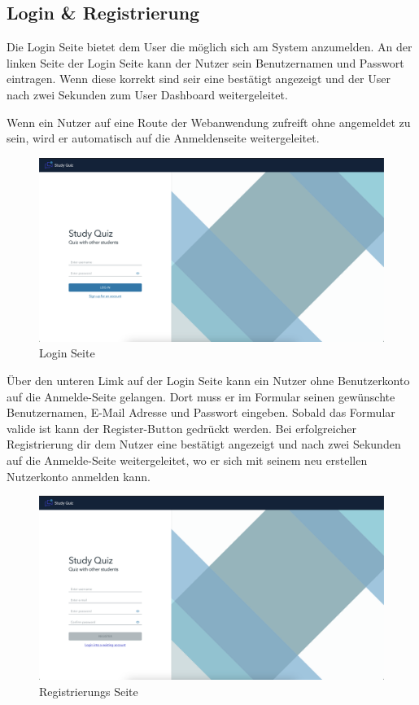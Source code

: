\subsection*{Login \& Registrierung}

Die Login Seite bietet dem User die möglich sich am System anzumelden. 
An der linken Seite der Login Seite kann der Nutzer sein Benutzernamen
und Passwort eintragen. Wenn diese korrekt sind seir eine bestätigt angezeigt
und der User nach zwei Sekunden zum User Dashboard weitergeleitet. \newline

\noindent Wenn ein Nutzer auf eine Route der Webanwendung zufreift ohne angemeldet
zu sein, wird er automatisch auf die Anmeldenseite weitergeleitet.

\begin{figure}[H]
  \includegraphics[width=\linewidth]{img/login.png}
  \caption{Login Seite}
  \label{fig:login}
\end{figure}

Über den unteren Limk auf der Login Seite kann ein Nutzer ohne Benutzerkonto auf die 
Anmelde-Seite gelangen. Dort muss er im Formular seinen gewünschte Benutzernamen, 
E-Mail Adresse und Passwort eingeben. Sobald das Formular valide ist kann der 
Register-Button gedrückt werden. Bei erfolgreicher Registrierung dir dem Nutzer 
eine bestätigt angezeigt und nach zwei Sekunden auf die Anmelde-Seite weitergeleitet,
wo er sich mit seinem neu erstellen Nutzerkonto anmelden kann.

\begin{figure}[H]
  \includegraphics[width=\linewidth]{img/register.png}
  \caption{Registrierungs Seite}
  \label{fig:register}
\end{figure}

